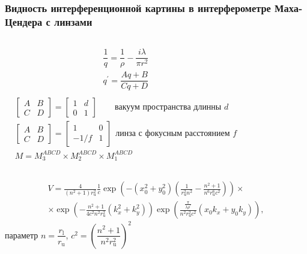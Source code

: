 \begin{frame}
\frametitle{Видность интерференционной картины в интерферометре Маха-Цендера с линзами}
\begin{columns}
\begin{align*}
& \dfrac{1}{q} = \dfrac{1}{\rho} - \dfrac{i \lambda}{\pi r^2} \\
& q^{\prime}=\dfrac{A q+B}{C q+D}\\
\end{align*}
\begin{align*}
& \begin{bmatrix} A & B \\ C & D \end{bmatrix}=\begin{bmatrix} 1 & d \\ 0 & 1 \end{bmatrix} \hspace{25pt}\text{вакуум пространства длинны $d$}\\
& \begin{bmatrix} A & B \\ C & D \end{bmatrix}=\begin{bmatrix} 1 & 0 \\ -1/f & 1 \end{bmatrix} \hspace{5pt}\text{линза с фокусным расстоянием $f$} \\
& M = M_3^{ABCD} \times M_2^{ABCD} \times M_1^{ABCD}
\end{align*}
\end{columns}

\begin{equation*}
\begin{split}
    V =\frac{4}{\left(n^{2}+1\right) r_{\mathrm{u}}^{2}} \frac{1}{c} \exp \left(-\left(x_{0}^{2}+y_{0}^{2}\right)\left(\frac{1}{r_{\mathrm{u}}^{2} n^{2}}-\frac{n^{2}+1}{n^{6} r_{\mathrm{u}}^{6} c^{2}}\right)\right) \times \\ \times \exp \left(-\frac{n^{2}+1}{4 c^{2} n^{2} r_{\mathrm{u}}^{2}}\left(k_{x}^{2}+k_{y}^{2}\right)\right) \exp \left(\frac{\frac{\pi}{\lambda \rho^{\prime}}}{n^{2} r_{\mathrm{u}}^{2} c^{2}}\left(x_{0} k_{x}+y_{0} k_{y}\right)\right),
\end{split}
\end{equation*}
параметр $n=\dfrac{r_{\mathrm{l}}}{r_{\mathrm{u}}}$, $c^2 = (\dfrac{n^2 + 1}{n^2r^2_{\mathrm{u}}})^2$
\end{frame}

